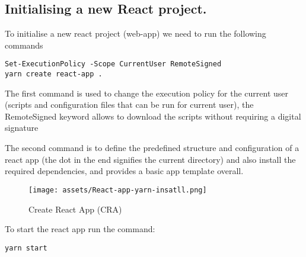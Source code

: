 \documentclass[12pt]{article}
\begin{document}
\subsection{Initialising a new React project.}
To initialise a new react project (web-app) we need to run the following commands

\begin{listing}[htbp]
\begin{verbatim}
Set-ExecutionPolicy -Scope CurrentUser RemoteSigned
yarn create react-app .
\end{verbatim}
\end{listing}

The first command is used to change the execution policy for the current user (scripts and configuration files that can be run for current user), the RemoteSigned keyword allows to download the scripts without requiring a digital signature

The second command is to define the predefined structure and configuration of a react app (the dot in the end signifies the current directory) and also install the required dependencies, and provides a basic app template overall.


\begin{figure}[H]
    \centering
    \texttt{[image: assets/React-app-yarn-insatll.png]}
    \caption{Create React App (CRA)}
    \label{fig:logo}
\end{figure}

To start the react app run the command:

\begin{listing}[htbp]
\begin{verbatim}
yarn start
\end{verbatim}
\end{listing}
\end{document}
